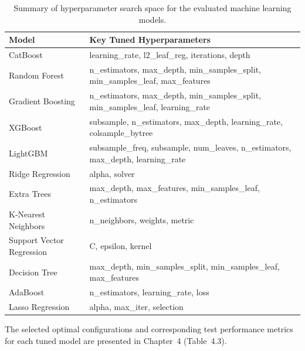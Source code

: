 \begin{table}[H]
\centering
\renewcommand{\arraystretch}{1.2}
\begin{tabular}{|p{4cm}|p{10.5cm}|}
\hline
\textbf{Model} & \textbf{Key Tuned Hyperparameters} \\ \hline

CatBoost &
learning\_rate, l2\_leaf\_reg, iterations, depth \\ \hline

Random Forest &
n\_estimators, max\_depth, min\_samples\_split, min\_samples\_leaf, max\_features \\ \hline

Gradient Boosting &
n\_estimators, max\_depth, min\_samples\_split, min\_samples\_leaf, learning\_rate \\ \hline

XGBoost &
subsample, n\_estimators, max\_depth, learning\_rate, colsample\_bytree \\ \hline

LightGBM &
subsample\_freq, subsample, num\_leaves, n\_estimators, max\_depth, learning\_rate \\ \hline

Ridge Regression &
alpha, solver \\ \hline

Extra Trees &
max\_depth, max\_features, min\_samples\_leaf, n\_estimators \\ \hline

K-Nearest Neighbors &
n\_neighbors, weights, metric \\ \hline

Support Vector Regression &
C, epsilon, kernel \\ \hline

Decision Tree &
max\_depth, min\_samples\_split, min\_samples\_leaf, max\_features \\ \hline

AdaBoost &
n\_estimators, learning\_rate, loss \\ \hline

Lasso Regression &
alpha, max\_iter, selection \\ \hline

\end{tabular}
\caption{Summary of hyperparameter search space for the evaluated machine learning models.}
\label{tab:hyperparameter_space}
\end{table}

The selected optimal configurations and corresponding test performance metrics for each tuned model are presented in Chapter~4 (Table~4.3).


